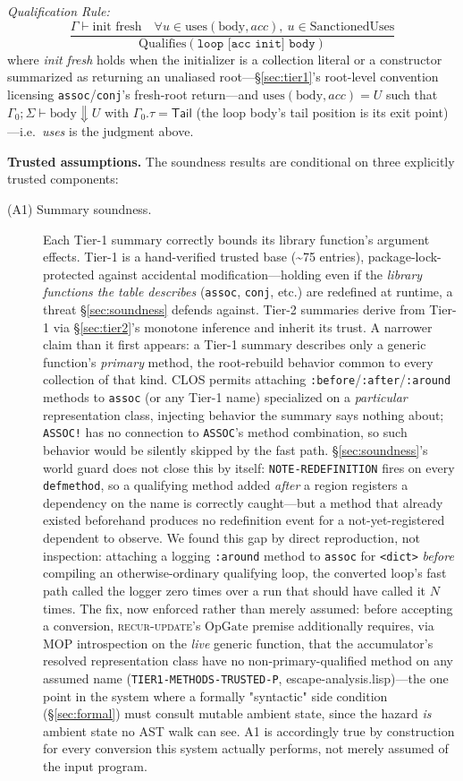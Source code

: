 \documentclass[sigplan,review,anonymous]{acmart}
\begin{document}
\emph{Qualification Rule:}
\[
\frac{\Gamma \vdash \text{init fresh} \quad \forall u \in \text{uses}(\text{body}, acc),\ u \in \text{SanctionedUses}}{\text{Qualifies}(\texttt{loop [acc init] body})}
\]
where \emph{init fresh} holds when the initializer is a collection literal or a constructor summarized as returning an unaliased root---§\ref{sec:tier1}'s root-level convention licensing \texttt{assoc}/\texttt{conj}'s fresh-root return---and $\mathrm{uses}(\mathrm{body}, acc) = U$ such that $\Gamma_0; \Sigma \vdash \mathrm{body} \Downarrow U$ with $\Gamma_0.\tau = \mathsf{Tail}$ (the loop body's tail position is its exit point)---i.e.\ \emph{uses} is the judgment above.

\textbf{Trusted assumptions.} The soundness results are conditional on three explicitly trusted components:
\begin{description}
    \item[(A1) Summary soundness.] Each Tier-1 summary correctly bounds its library function's argument effects. Tier-1 is a hand-verified trusted base (\textasciitilde75 entries), package-lock-protected against accidental modification---holding even if the \emph{library functions the table describes} (\texttt{assoc}, \texttt{conj}, etc.) are redefined at runtime, a threat §\ref{sec:soundness} defends against. Tier-2 summaries derive from Tier-1 via §\ref{sec:tier2}'s monotone inference and inherit its trust. A narrower claim than it first appears: a Tier-1 summary describes only a generic function's \emph{primary} method, the root-rebuild behavior common to every collection of that kind. CLOS permits attaching \texttt{:before}/\texttt{:after}/\texttt{:around} methods to \texttt{assoc} (or any Tier-1 name) specialized on a \emph{particular} representation class, injecting behavior the summary says nothing about; \texttt{ASSOC!} has no connection to \texttt{ASSOC}'s method combination, so such behavior would be silently skipped by the fast path. §\ref{sec:soundness}'s world guard does not close this by itself: \texttt{NOTE-REDEFINITION} fires on every \texttt{defmethod}, so a qualifying method added \emph{after} a region registers a dependency on the name is correctly caught---but a method that already existed beforehand produces no redefinition event for a not-yet-registered dependent to observe. We found this gap by direct reproduction, not inspection: attaching a logging \texttt{:around} method to \texttt{assoc} for \texttt{<dict>} \emph{before} compiling an otherwise-ordinary qualifying loop, the converted loop's fast path called the logger zero times over a run that should have called it $N$ times. The fix, now enforced rather than merely assumed: before accepting a conversion, \textsc{recur-update}'s $\mathrm{OpGate}$ premise additionally requires, via MOP introspection on the \emph{live} generic function, that the accumulator's resolved representation class have no non-primary-qualified method on any assumed name (\texttt{TIER1-METHODS-TRUSTED-P}, escape-analysis.lisp)---the one point in the system where a formally "syntactic" side condition (§\ref{sec:formal}) must consult mutable ambient state, since the hazard \emph{is} ambient state no AST walk can see. A1 is accordingly true by construction for every conversion this system actually performs, not merely assumed of the input program.

\end{description}
\end{document}
